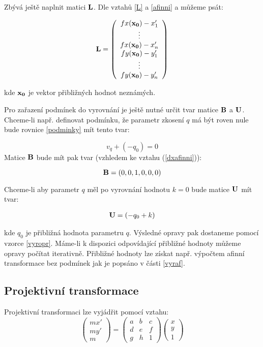 Zbývá ještě naplnit matici ${\bf L}$. Dle vztahů \ref{L} a \ref{afinni} a
můžeme psát:

\begin{eqnarray} \nonumber
{\bf L}= \left(
\begin{array}{c}
   fx({\bf x_0}) - x'_1  \\    
     \vdots  \\ 
   fx({\bf x_0}) - x'_n  \\
   fy({\bf x_0}) - y'_1 \\
      \vdots  \\ 
   fy({\bf x_0}) - y'_n\\
\end{array}
\right)
\end{eqnarray}

kde ${\bf x_0}$ je vektor přibližných hodnot neznámých.

Pro zařazení podmínek do vyrovnání je ještě nutné určit tvar matice $\bf B$ a  $\bf U$.
Chceme-li např. definovat podmínku, že parametr zkosení $q$ má být roven nule
bude rovnice \ref{podminky} mít tento tvar:

$$ v_q + (-q_0) = 0$$
Matice $\bf B$ bude mít pak tvar (vzhledem ke vztahu (\ref{dxafinni})):

$$ {\bf B} = \left(0,0,1,0,0,0\right) $$ 

Chceme-li aby parametr $q$ měl po vyrovnání hodnotu $k = 0$ bude matice ${\bf
U}$ mít tvar:

$$
\begin{array}{c}
{\bf U} = \left(
-q_0 + k
\right)
\end{array}
$$ 

kde $q_0$ je přibližná hodnota parametru $q$. Výsledné opravy pak dostaneme
pomocí vzorce \ref{vyropr}. Máme-li k dispozici odpovídající přibližné hodnoty
můžeme opravy počítat iterativně. Přibližné hodnoty lze získat např. výpočtem
afinní transformace bez podmínek jak je popsáno v části \ref{vyraf}.

\subsection{Projektivní transformace}

Projektivní transformaci lze vyjádřit pomocí vztahu:
$$
\left(
\begin{array}{c}
mx'\\
my'\\ 
m
\end{array}
\right) 
= 
\left(
\begin{array}{ccc}
a & b &  c\\
d &  e & f\\ 
g & h & 1
\end{array}
\right) 
\left(
\begin{array}{c}
x\\
y\\ 
1
\end{array}
\right) 
$$

